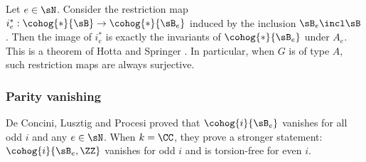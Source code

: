 \subsubsection{} Let $e\in\sN$. Consider the restriction map $i^{*}_{e}: \cohog{*}{\sB}\to \cohog{*}{\sB_{e}}$ induced by the inclusion $\sB_{e}\incl\sB$. Then the image of $i^{*}_{e}$ is exactly the invariants of $\cohog{*}{\sB_{e}}$ under $A_{e}$. This is a theorem of Hotta and Springer \cite[Theorem 1.1]{HottaSpringer}. In particular, when $G$ is of type $A$, such restriction maps are always surjective.


\subsubsection{Parity vanishing} De Concini, Lusztig and Procesi \cite{DLP} proved that $\cohog{i}{\sB_{e}}$ vanishes for all odd $i$ and any $e\in\sN$. When $k=\CC$, they prove a stronger statement: $\cohog{i}{\sB_{e},\ZZ}$ vanishes for odd $i$ and is torsion-free for even $i$.



